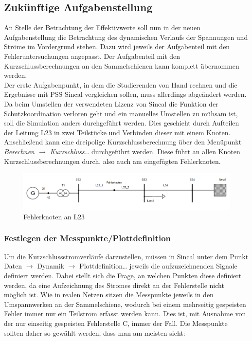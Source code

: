 \documentclass{scrartcl}
\begin{document}
\begin{onehalfspace}
\subsection{Zukünftige Aufgabenstellung}
An Stelle der Betrachtung der Effektivwerte soll nun in der neuen Aufgabenstellung die Betrachtung des dynamischen Verlaufs der Spannungen und Ströme im Vordergrund stehen. Dazu wird jeweils der Aufgabenteil mit den Fehleruntersuchungen angepasst. Der Aufgabenteil mit den Kurzschlussberechnungen an den Sammelschienen kann komplett übernommen werden. \\
Der erste Aufgabenpunkt, in dem die Studierenden von Hand rechnen und die Ergebnisse mit PSS Sincal vergleichen sollen, muss allerdings abgeändert werden. Da beim Umstellen der verwendeten Lizenz von Sincal die Funktion der Schutzkoordination verloren geht und ein manuelles Umstellen zu mühsam ist, soll die Simulation anders durchgeführt werden. Dies geschieht durch Aufteilen der Leitung L23 in zwei Teilstücke und Verbinden dieser mit einem Knoten. Anschließend kann eine dreipolige Kurzschlussberechnung über den Menüpunkt \textit{Berechnen $\rightarrow$ Kurzschluss…} durchgeführt werden. Diese führt an allen Knoten Kurzschlussberechnungen durch, also auch am eingefügten \glqq Fehlerknoten\grqq.

	\begin{figure}[H]
	\centering
	\includegraphics[scale=0.4]{img/ks-versuch_l23.png}
	\caption{Fehlerknoten an L23}
	\label{fehlerknoten_l23}
	\end{figure}

\subsubsection{Festlegen der Messpunkte/Plottdefinition}
Um die Kurzschlussstromverläufe darzustellen, müssen in Sincal unter dem Punkt Daten $\rightarrow$ Dynamik $\rightarrow$ Plottdefinition… jeweils die aufzuzeichnenden Signale definiert werden. Dabei stellt sich die Frage, an welchen Punkten diese definiert werden, da eine Aufzeichnung des Stromes direkt an der Fehlerstelle nicht möglich ist. Wie in realen Netzen sitzen die Messpunkte jeweils in den Umspannwerken an der Sammelschiene, wodurch bei einem mehrseitig gespeisten Fehler immer nur ein Teilstrom erfasst werden kann. Dies ist, mit Ausnahme von der nur einseitig gespeisten Fehlerstelle C, immer der Fall. Die Messpunkte sollten daher so gewählt werden, dass man \glqq am meisten sieht\grqq:


\end{onehalfspace}
\end{document}
